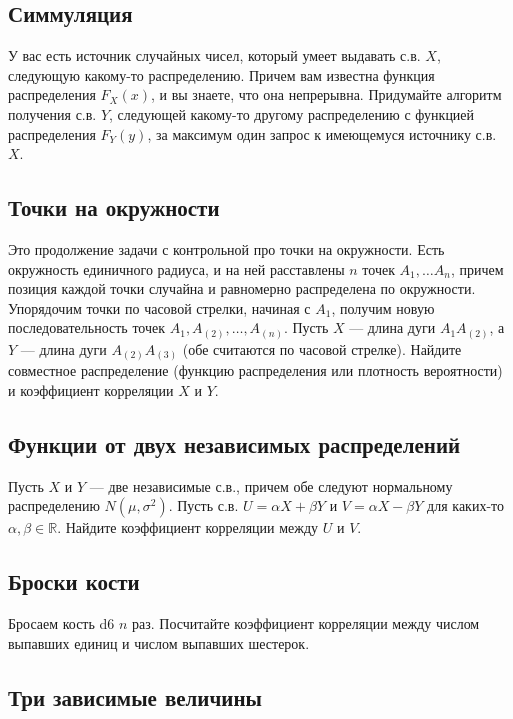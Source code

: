 \documentclass[12pt]{article}
\newcommand\R{\mathbb{R}}
\begin{document}
\subsection{Симмуляция}

У вас есть источник случайных чисел, который умеет выдавать с.в. $X$, следующую какому-то распределению. Причем вам известна функция распределения $F_X(x)$, и вы знаете, что она непрерывна. Придумайте алгоритм получения с.в. $Y$, следующей какому-то другому распределению с функцией распределения $F_Y(y)$, за максимум один запрос к имеющемуся источнику с.в. $X$.

\subsection{Точки на окружности}

Это продолжение задачи с контрольной про точки на окружности. Есть окружность единичного радиуса, и на ней расставлены $n$ точек $A_1, \dots A_n$, причем позиция каждой точки случайна и равномерно распределена по окружности. Упорядочим точки по часовой стрелки, начиная с $A_1$, получим новую последовательность точек $A_1, A_{(2)}, \dots, A_{(n)}$. Пусть $X$ --- длина дуги $A_1 A_{(2)}$, а $Y$ --- длина дуги $A_{(2)} A_{(3)}$ (обе считаются по часовой стрелке). Найдите совместное распределение (функцию распределения или плотность вероятности) и коэффициент корреляции $X$ и $Y$. 

\subsection{Функции от двух независимых распределений}

Пусть $X$ и $Y$ --- две независимые с.в., причем обе следуют нормальному распределению $N(\mu, \sigma^2)$. Пусть с.в. $U = \alpha X + \beta Y$ и $V = \alpha X - \beta Y$ для каких-то $\alpha, \beta \in \R$. Найдите коэффициент корреляции между $U$ и $V$.

\subsection{Броски кости}

Бросаем кость d6 $n$ раз. Посчитайте коэффициент корреляции между числом выпавших единиц и числом выпавших шестерок.

\subsection{Три зависимые величины}
\end{document}
